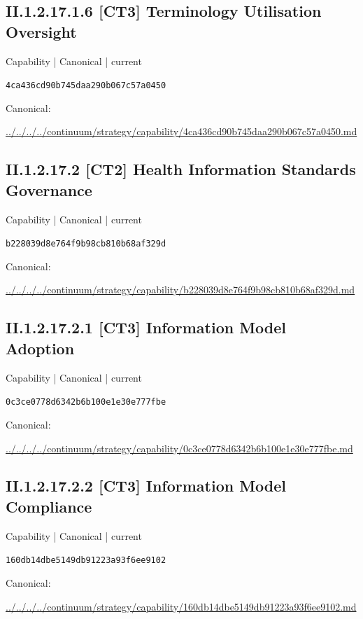 \documentclass[10pt,a4paper]{article}
\begin{document}
\subsection*{II.1.2.17.1.6 [CT3] Terminology Utilisation Oversight}
\label{element-4ca436cd90b745daa290b067c57a0450}
{\small Capability | Canonical | current}\par
\texttt{4ca436cd90b745daa290b067c57a0450}\par
Canonical: \par
{\footnotesize\url{../../../../continuum/strategy/capability/4ca436cd90b745daa290b067c57a0450.md}}\par
\subsection*{II.1.2.17.2 [CT2] Health Information Standards Governance}
\label{element-b228039d8e764f9b98cb810b68af329d}
{\small Capability | Canonical | current}\par
\texttt{b228039d8e764f9b98cb810b68af329d}\par
Canonical: \par
{\footnotesize\url{../../../../continuum/strategy/capability/b228039d8e764f9b98cb810b68af329d.md}}\par
\subsection*{II.1.2.17.2.1 [CT3] Information Model Adoption}
\label{element-0c3ce0778d6342b6b100e1e30e777fbe}
{\small Capability | Canonical | current}\par
\texttt{0c3ce0778d6342b6b100e1e30e777fbe}\par
Canonical: \par
{\footnotesize\url{../../../../continuum/strategy/capability/0c3ce0778d6342b6b100e1e30e777fbe.md}}\par
\subsection*{II.1.2.17.2.2 [CT3] Information Model Compliance}
\label{element-160db14dbe5149db91223a93f6ee9102}
{\small Capability | Canonical | current}\par
\texttt{160db14dbe5149db91223a93f6ee9102}\par
Canonical: \par
{\footnotesize\url{../../../../continuum/strategy/capability/160db14dbe5149db91223a93f6ee9102.md}}\par
\end{document}
